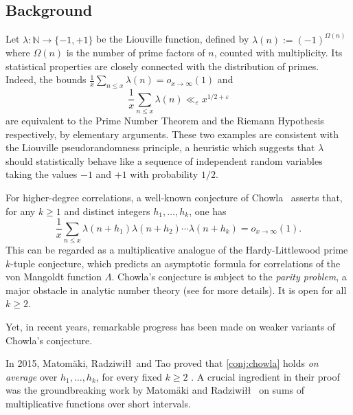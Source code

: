 \documentclass[11pt]{amsart}
\theoremstyle{definition}
\renewcommand{\leq}{\leqslant}
\renewcommand{\geq}{\geqslant}
\newcommand{\eps}{\varepsilon}
\begin{document}
\subsection{Background}
Let $\lambda : \mathbb{N} \to \{-1, +1\}$ be the Liouville function, defined by $\lambda(n) := (-1)^{\Omega(n)}$ where $\Omega(n)$ is the number of prime factors of $n$, counted with multiplicity. Its statistical properties are closely connected with the distribution of primes. Indeed, the bounds $\frac{1}{x}\sum_{n\leq x} \lambda(n) = o_{x\to \infty}(1)$ and 
\begin{equation*}
	\frac{1}{x}\sum_{n\leq x} \lambda(n) \ll_{\eps}x^{1/2+\eps}
\end{equation*}
are equivalent to the Prime Number Theorem and the Riemann Hypothesis respectively, by elementary arguments. These two examples are consistent with the Liouville pseudorandomness principle, a heuristic which suggests that $\lambda$ should statistically behave like a sequence of independent random variables taking the values $-1$ and $+1$ with probability $1/2$. 

For higher-degree correlations, a well-known conjecture of Chowla~\cite{chowla} asserts that, for any $k\geq 1$ and distinct integers $h_1, \ldots, h_{k}$, one has
\begin{equation}
\label{conj:chowla}
	\frac{1}{x}\sum_{n\leq x} \lambda(n+h_1) \lambda(n+h_2) \cdots \lambda(n+h_k) = o_{x\to \infty}(1).
\end{equation}
This can be regarded as a multiplicative analogue of the Hardy-Littlewood prime $k$-tuple conjecture, which predicts an asymptotic formula for correlations of the von Mangoldt function $\Lambda$. Chowla's conjecture is subject to the \emph{parity problem}, a major obstacle in analytic number theory (see \cite[Section~16.4]{opera} for more details). It is open for all $k\geq 2$.

Yet, in recent years, remarkable progress has been made on weaker variants of Chowla's conjecture.

In 2015, Matomäki, Radziwi\l\l~and Tao proved that \cref{conj:chowla} holds \emph{on average} over $h_1, \ldots, h_k$, for every fixed $k\geq 2$ \cite{MRT}. A crucial ingredient in their proof was the groundbreaking work by Matomäki and Radziwi\l\l~\cite{MR} on sums of multiplicative functions over short intervals.
\end{document}
